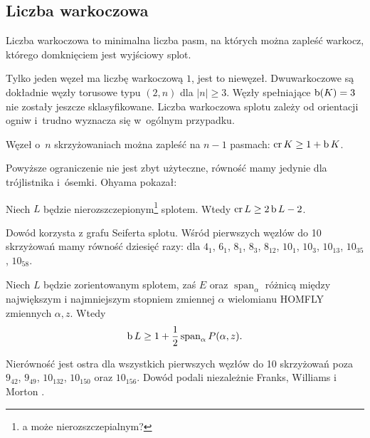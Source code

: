
\subsection{Liczba warkoczowa} %

\begin{definition}
\label{def:braid_number}%
    Liczba warkoczowa to minimalna liczba pasm, na których można zapleść warkocz, którego domknięciem jest wyjściowy splot.
\end{definition}

Tylko jeden węzeł ma liczbę warkoczową $1$, jest to niewęzeł.
Dwuwarkoczowe są dokładnie węzły torusowe typu $(2, n)$ dla $|n| \ge 3$.
Węzły spełniające $\operatorname{b} (K) = 3$ nie zostały jeszcze sklasyfikowane.
Liczba warkoczowa splotu zależy od orientacji ogniw i~trudno wyznacza się w~ogólnym przypadku.

\begin{proposition}
    Węzeł o~$n$ skrzyżowaniach można zapleść na $n - 1$ pasmach: $\operatorname{cr} K \ge 1 + \operatorname{b} K$.
\end{proposition}

Powyższe ograniczenie nie jest zbyt użyteczne, równość mamy jedynie dla trójlistnika i~ósemki.
Ohyama \cite{ohyama93} pokazał:
%

\begin{proposition}
    Niech $L$ będzie nierozszczepionym\footnote{a może nierozszczepialnym?} splotem.
    Wtedy $\operatorname{cr} L \ge 2 \operatorname{b} L - 2$.
\end{proposition}

Dowód korzysta z grafu Seiferta splotu.
Wśród pierwszych węzłów do 10 skrzyżowań mamy równość dziesięć razy: dla $4_1$, $6_1$, $8_1$, $8_3$, $8_{12}$, $10_1$, $10_3$, $10_{13}$, $10_{35}$, $10_{58}$.

\begin{proposition}
    Niech $L$ będzie zorientowanym splotem, zaś $E$ oraz $\operatorname{span}_\alpha$ różnicą między największym i najmniejszym stopniem zmiennej $\alpha$ wielomianu HOMFLY zmiennych $\alpha, z$.
    Wtedy
    \begin{equation}
        \operatorname{b} L \ge 1 + \frac 1 2 \operatorname{span}_\alpha P(\alpha, z).
    \end{equation}
\end{proposition}

Nierówność jest ostra dla wszystkich pierwszych węzłów do 10 skrzyżowań poza $9_{42}$, $9_{49}$, $10_{132}$, $10_{150}$ oraz $10_{156}$.
Dowód podali niezależnie Franks, Williams \cite{franks87} i Morton \cite{morton88}.
%
%
%

